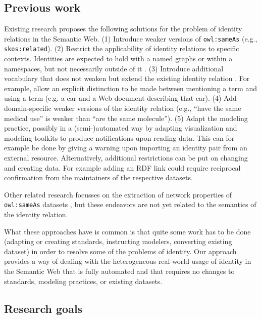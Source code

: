 \documentclass[letterpaper]{article}
\begin{document}
\subsection{Previous work}
\label{sec:previous_work}

Existing research proposes the following solutions for the problem of identity relations in the Semantic Web. (1) Introduce weaker versions of \verb|owl:sameAs| \cite{halpin_hayes_2010,mccusker_mcguinness_2010} (e.g., \verb|skos:related|). (2) Restrict the applicability of identity relations to specific contexts. Identities are expected to hold with a named graphs or within a namespaces, but not necessarily outside of it \cite{halpin_hayes_2010,melo_2013}. (3) Introduce additional vocabulary that does not weaken but extend the existing identity relation \cite{halpin_hayes_2010}. For example, allow an explicit distinction to be made between mentioning a term and using a term (e.g. a car and a Web document describing that car). (4) Add domain-specific weaker versions of the identity relation \cite{mccusker_mcguinness_2010} (e.g., ``have the same medical use'' is weaker than ``are the same molecule''). (5) Adapt the modeling practice, possibly in a (semi-)automated way by adapting visualization and modeling toolkits to produce notifications upon reading data. This can for example be done by giving a warning upon importing an identity pair from an external resource. Alternatively, additional restrictions can be put on changing and creating data. For example adding an RDF link could require reciprocal confirmation from the maintainers of the respective datasets. \cite{halpin_hayes_2010,ding_shinavier_finin_mcguinness_2010}

Other related research focusses on the extraction of network properties of \verb|owl:sameAs| datasets \cite{ding_shinavier_shangguan_mcguinness_2010}, but these endeavors are not yet related to the semantics of the identity relation.

What these approaches have is common is that quite some work has to be done (adapting or creating standards, instructing modelers, converting existing dataset) in order to resolve some of the problems of identity. Our approach provides a way of dealing with the heterogeneous real-world usage of identity in the Semantic Web that is fully automated and that requires no changes to standards, modeling practices, or existing datasets.

\subsection{Research goals}
\label{sec:research_goals}
\end{document}

